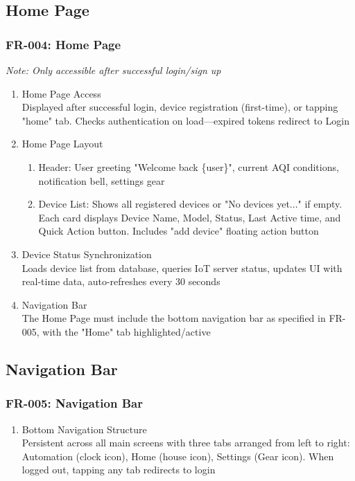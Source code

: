 \documentclass[conference]{IEEEtran}
\begin{document}
        \subsection{\textbf{Home Page}}
            \subsubsection{FR-004: Home Page}
                \textit{Note: Only accessible after successful login/sign up}
                    \begin{enumerate}
                        \item Home Page Access\\
                            Displayed after successful login, device registration (first-time), or tapping "home" tab. Checks authentication on load—expired tokens redirect to Login
                        \item Home Page Layout
                            \begin{enumerate}
                                \item Header: User greeting "Welcome back \{user\}", current AQI conditions, notification bell, settings gear
                                \item Device List: Shows all registered devices or "No devices yet..." if empty. Each card displays Device Name, Model, Status, Last Active time, and Quick Action button. Includes "add device" floating action button
                            \end{enumerate}
                        \item Device Status Synchronization\\
                            Loads device list from database, queries IoT server status, updates UI with real-time data, auto-refreshes every 30 seconds
                        \item Navigation Bar\\
                            The Home Page must include the bottom navigation bar as specified in FR-005, with the "Home" tab highlighted/active
                    \end{enumerate}

        \subsection{\textbf{Navigation Bar}}
            \subsubsection{FR-005: Navigation Bar}
                \begin{enumerate}
                    \item Bottom Navigation Structure\\
                    Persistent across all main screens with three tabs arranged from left to right: Automation (clock icon), Home (house icon), Settings (Gear icon). When logged out, tapping any tab redirects to login
                \end{enumerate}
\end{document}
